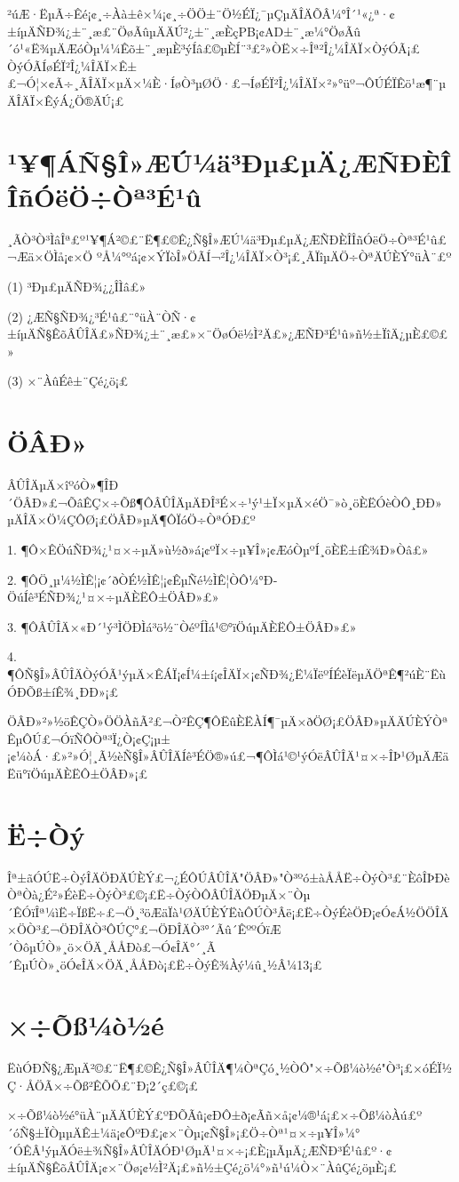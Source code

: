     ²úÆ·ËµÃ÷Êé¡¢¸÷Àà±ê×¼¡¢¸÷ÖÖ±¨Ö½ÉÏ¿¯µÇµÄÎÄÕÂ¼°Î´¹«¿ª·¢±íµÄÑÐ¾¿±¨¸æ£¨ÖøÃûµÄÄÚ²¿±¨¸æÈçPB¡¢AD±¨¸æ¼°ÖøÃû´ó¹«Ë¾µÄÆóÒµ¼¼Êõ±¨¸æµÈ³ýÍâ£©µÈÍ¨³£²»ÒË×÷Îª²Î¿¼ÎÄÏ×ÒýÓÃ¡£
ÒýÓÃÍøÉÏ²Î¿¼ÎÄÏ×Ê±£¬Ó¦×¢Ã÷¸ÃÎÄÏ×µÄ×¼È·ÍøÒ³µØÖ·£¬ÍøÉÏ²Î¿¼ÎÄÏ×²»°üº¬ÔÚÉÏÊö¹æ¶¨µÄÎÄÏ×ÊýÁ¿Ö®ÄÚ¡£


\section{¹¥¶ÁÑ§Î»ÆÚ¼ä³Ðµ£µÄ¿ÆÑÐÈÎÎñÓëÖ÷Òª³É¹û}

¸ÃÒ³Ò³ÌâÎª£º¹¥¶Á²©£¨Ë¶£©Ê¿Ñ§Î»ÆÚ¼ä³Ðµ£µÄ¿ÆÑÐÈÎÎñÓëÖ÷Òª³É¹û£¬Æä×ÖÌå¡¢×Ö
ºÅ¼°ºá¡¢×ÝÏòÎ»ÖÃÍ¬²Î¿¼ÎÄÏ×Ò³¡£¸ÃÏîµÄÖ÷ÒªÄÚÈÝ°üÀ¨£º

(1)	³Ðµ£µÄÑÐ¾¿¿ÎÌâ£»

(2)	¿ÆÑ§ÑÐ¾¿³É¹û£¨°üÀ¨ÒÑ·¢±íµÄÑ§ÊõÂÛÎÄ£»ÑÐ¾¿±¨¸æ£»×¨ÖøÓë½Ì²Ä£»¿ÆÑÐ³É¹û»ñ½±ÏîÄ¿µÈ£©£»

(3)	×¨ÀûÉê±¨Çé¿ö¡£

\section{ÖÂÐ»}

ÂÛÎÄµÄ×îºóÒ»¶ÎÐ´ÖÂÐ»£¬ÕâÊÇ×÷Õß¶ÔÂÛÎÄµÄÐÎ³É×÷¹ý¹±Ï×µÄ×éÖ¯»ò¸öÈËÓèÒÔ¸ÐÐ»
µÄÎÄ×Ö¼ÇÔØ¡£ÖÂÐ»µÄ¶ÔÏóÖ÷ÒªÓÐ£º

1.	¶Ô×ÊÖúÑÐ¾¿¹¤×÷µÄ»ù½ð»á¡¢ºÏ×÷µ¥Î»¡¢ÆóÒµºÍ¸öÈË±íÊ¾Ð»Òâ£»

2.	¶ÔÖ¸µ¼½ÌÊ¦¡¢´ðÒÉ½ÌÊ¦¡¢ÊµÑé½ÌÊ¦ÒÔ¼°Ð­ÖúÍê³ÉÑÐ¾¿¹¤×÷µÄÈËÔ±ÖÂÐ»£»

3.	¶ÔÂÛÎÄ×«Ð´¹ý³ÌÖÐÌá³ö½¨ÒéºÍÌá¹©°ïÖúµÄÈËÔ±ÖÂÐ»£»

4.	¶ÔÑ§Î»ÂÛÎÄÒýÓÃ¹ýµÄ×ÊÁÏ¡¢Í¼±í¡¢ÎÄÏ×¡¢ÑÐ¾¿Ë¼ÏëºÍÉèÏëµÄÖªÊ¶²úÈ¨ËùÓÐÕß±íÊ¾¸ÐÐ»¡£

ÖÂÐ»²»½öÊÇÒ»ÖÖÀñÃ²£¬Ò²ÊÇ¶ÔËûÈËÀÍ¶¯µÄ×ðÖØ¡£ÖÂÐ»µÄÄÚÈÝÒªÊµÔÚ£¬ÓïÑÔÒª³Ï¿Ò¡¢Ç¡µ±¡¢¼òÁ·£»²»Ó¦¸Ã½èÑ§Î»ÂÛÎÄÍê³ÉÖ®»ú£¬¶ÔÌá¹©¹ýÓëÂÛÎÄ¹¤×÷ÎÞ¹ØµÄÆäËü°ïÖúµÄÈËÔ±ÖÂÐ»¡£

\section{Ë÷Òý}

Îª±ãÓÚË÷ÒýÎÄÖÐÄÚÈÝ£¬¿ÉÔÚÂÛÎÄ"ÖÂÐ»"Ò³ºó±àÅÅË÷ÒýÒ³£¨ÈôÎÞÐèÒªÒà¿É²»ÉèË÷ÒýÒ³£©¡£Ë÷ÒýÒÔÂÛÎÄÖÐµÄ×¨Òµ´ÊÓïÎª¼ìË÷ÏßË÷£¬Ö¸³öÆäÏà¹ØÄÚÈÝËùÔÚÒ³Âë¡£Ë÷ÒýÉèÖÐ¡¢Ó¢Á½ÖÖÎÄ×ÖÒ³£¬ÖÐÎÄÒ³ÔÚÇ°£¬ÖÐÎÄÒ³°´Ãû´ÊººÓïÆ´ÒôµÚÒ»¸ö×ÖÄ¸ÅÅÐò£¬Ó¢ÎÄ°´¸Ã´ÊµÚÒ»¸öÓ¢ÎÄ×ÖÄ¸ÅÅÐò¡£Ë÷ÒýÊ¾Àý¼û¸½Â¼13¡£

\section{×÷Õß¼ò½é}

ËùÓÐÑ§¿ÆµÄ²©£¨Ë¶£©Ê¿Ñ§Î»ÂÛÎÄ¶¼ÒªÇó¸½ÒÔ"×÷Õß¼ò½é"Ò³¡£×óÉÏ½Ç·ÅÖÃ×÷Õß²ÊÕÕ£¨Ð¡2´ç£©¡£

×÷Õß¼ò½é°üÀ¨µÄÄÚÈÝ£ºÐÕÃû¡¢ÐÔ±ð¡¢Ãñ×å¡¢¼®¹á¡£×÷Õß¼òÀú£º´óÑ§±ÏÒµµÄÊ±¼ä¡¢ÔºÐ£¡¢×¨Òµ¡¢Ñ§Î»¡£Ö÷Òª¹¤×÷µ¥Î»¼°´ÓÊÂ¹ýµÄÓë±¾Ñ§Î»ÂÛÎÄÓÐ¹ØµÄ¹¤×÷¡£È¡µÃµÄ¿ÆÑÐ³É¹û£º·¢±íµÄÑ§ÊõÂÛÎÄ¡¢×¨Öø¡¢½Ì²Ä¡£»ñ½±Çé¿ö¼°»ñ¹ú¼Ò×¨ÀûÇé¿öµÈ¡£
